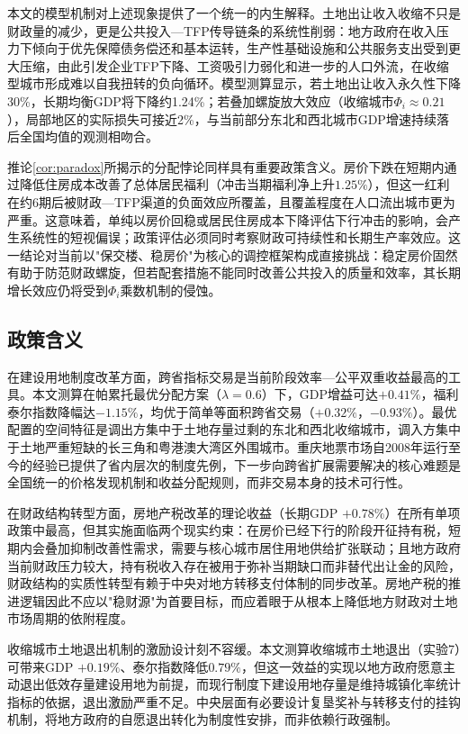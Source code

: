 \documentclass[UTF8,a4paper,12pt]{ctexart}
\theoremstyle{plain}
\theoremstyle{definition}
\theoremstyle{remark}
\begin{document}
本文的模型机制对上述现象提供了一个统一的内生解释。土地出让收入收缩不只是财政量的减少，更是公共投入—TFP传导链条的系统性削弱：地方政府在收入压力下倾向于优先保障债务偿还和基本运转，生产性基础设施和公共服务支出受到更大压缩，由此引发企业TFP下降、工资吸引力弱化和进一步的人口外流，在收缩型城市形成难以自我扭转的负向循环。模型测算显示，若土地出让收入永久性下降30\%，长期均衡GDP将下降约1.24\%；若叠加螺旋放大效应（收缩城市$\Phi_i\approx 0.21$），局部地区的实际损失可接近2\%，与当前部分东北和西北城市GDP增速持续落后全国均值的观测相吻合。

推论\ref{cor:paradox}所揭示的分配悖论同样具有重要政策含义。房价下跌在短期内通过降低住房成本改善了总体居民福利（冲击当期福利净上升$1.25\%$），但这一红利在约6期后被财政—TFP渠道的负面效应所覆盖，且覆盖程度在人口流出城市更为严重。这意味着，单纯以房价回稳或居民住房成本下降评估下行冲击的影响，会产生系统性的短视偏误；政策评估必须同时考察财政可持续性和长期生产率效应。这一结论对当前以"保交楼、稳房价"为核心的调控框架构成直接挑战：稳定房价固然有助于防范财政螺旋，但若配套措施不能同时改善公共投入的质量和效率，其长期增长效应仍将受到$\Phi_i$乘数机制的侵蚀。

\subsection{政策含义}

在建设用地制度改革方面，跨省指标交易是当前阶段效率—公平双重收益最高的工具。本文测算在帕累托最优分配方案（$\lambda=0.6$）下，GDP增益可达$+0.41\%$，福利泰尔指数降幅达$-1.15\%$，均优于简单等面积跨省交易（$+0.32\%$，$-0.93\%$）。最优配置的空间特征是调出方集中于土地存量过剩的东北和西北收缩城市，调入方集中于土地严重短缺的长三角和粤港澳大湾区外围城市。重庆地票市场自2008年运行至今的经验已提供了省内层次的制度先例，下一步向跨省扩展需要解决的核心难题是全国统一的价格发现机制和收益分配规则，而非交易本身的技术可行性。

在财政结构转型方面，房地产税改革的理论收益（长期GDP $+0.78\%$）在所有单项政策中最高，但其实施面临两个现实约束：在房价已经下行的阶段开征持有税，短期内会叠加抑制改善性需求，需要与核心城市居住用地供给扩张联动；且地方政府当前财政压力较大，持有税收入存在被用于弥补当期缺口而非替代出让金的风险，财政结构的实质性转型有赖于中央对地方转移支付体制的同步改革。房地产税的推进逻辑因此不应以"稳财源"为首要目标，而应着眼于从根本上降低地方财政对土地市场周期的依附程度。

收缩城市土地退出机制的激励设计刻不容缓。本文测算收缩城市土地退出（实验7）可带来GDP $+0.19\%$、泰尔指数降低$0.79\%$，但这一效益的实现以地方政府愿意主动退出低效存量建设用地为前提，而现行制度下建设用地存量是维持城镇化率统计指标的依据，退出激励严重不足。中央层面有必要设计复垦奖补与转移支付的挂钩机制，将地方政府的自愿退出转化为制度性安排，而非依赖行政强制。
\end{document}
